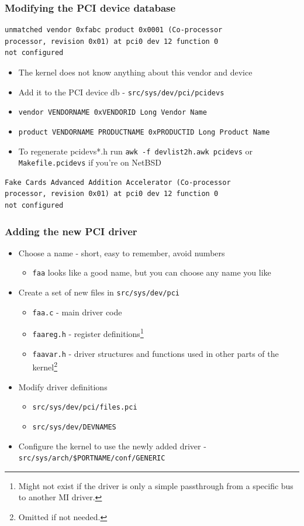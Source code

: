 \documentclass[dvipsnames,table]{beamer}
\begin{document}
\begin{frame}[fragile]
\frametitle{Modifying the PCI device database}
\begin{verbatim}
unmatched vendor 0xfabc product 0x0001 (Co-processor 
processor, revision 0x01) at pci0 dev 12 function 0 
not configured
\end{verbatim}
\begin{itemize}
	\item The kernel does not know anything about this vendor and device
	\item Add it to the PCI device db - {\tt src/sys/dev/pci/pcidevs}
	\item {\tt vendor VENDORNAME 0xVENDORID Long Vendor Name}
	\item {\tt product VENDORNAME PRODUCTNAME 0xPRODUCTID	Long Product Name}
	\item To regenerate pcidevs*.h run {\tt awk -f devlist2h.awk pcidevs} or
{\tt Makefile.pcidevs} if you're on NetBSD

\end{itemize}
\begin{verbatim}
Fake Cards Advanced Addition Accelerator (Co-processor 
processor, revision 0x01) at pci0 dev 12 function 0 
not configured
\end{verbatim}
\end{frame}

\begin{frame}
\frametitle{Adding the new PCI driver}
\begin{itemize}
	\item Choose a name - short, easy to remember, avoid numbers
	\begin{itemize}
		\item {\tt faa} looks like a good name, but you can choose any name you like
	\end{itemize}
	\item Create a set of new files in {\tt src/sys/dev/pci}
	\begin{itemize}
		\item {\tt faa.c} - main driver code
		\item {\tt faareg.h} - register definitions\footnote{Might not exist if the driver is only a simple passthrough from a specific bus to another MI driver.}
		\item {\tt faavar.h} - driver structures and functions used in other parts of the kernel\footnote{Omitted if not needed.}
	\end{itemize}
	\item Modify driver definitions
	\begin{itemize}
		\item {\tt src/sys/dev/pci/files.pci}
		\item {\tt src/sys/dev/DEVNAMES}
	\end{itemize}
	\item Configure the kernel to use the newly added driver - {\tt src/sys/arch/\$PORTNAME/conf/GENERIC}
\end{itemize}
\end{frame}
\end{document}
